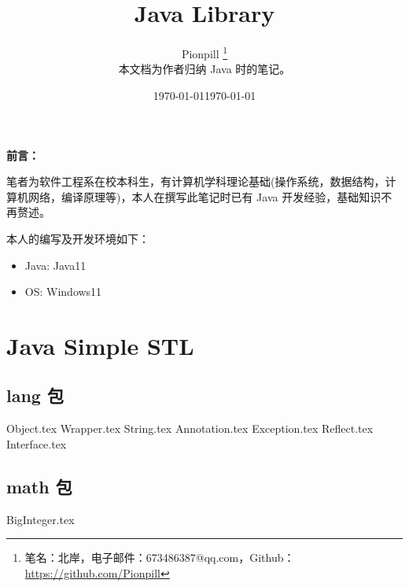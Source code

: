 \documentclass{PionpillNote-book}
\title{Java Library}
\author{
    Pionpill \footnote{笔名：北岸，电子邮件：673486387@qq.com，Github：\url{https://github.com/Pionpill}} \\
    本文档为作者归纳 Java 时的笔记。\\
}
\date{\today}
\begin{document}
\pagestyle{plain}
\maketitle

\noindent\textbf{前言：}

笔者为软件工程系在校本科生，有计算机学科理论基础(操作系统，数据结构，计算机网络，编译原理等)，本人在撰写此笔记时已有 Java 开发经验，基础知识不再赘述。

本人的编写及开发环境如下：
\begin{itemize}
    \item Java: Java11
    \item OS: Windows11
\end{itemize}

\date{\today}
\newpage

\tableofcontents

\newpage

\setcounter{page}{1} 
\pagestyle{fancy}

\part{Java Simple STL}
\chapter{lang 包}
{Object.tex}
{Wrapper.tex}
{String.tex}
{Annotation.tex}
{Exception.tex}
{Reflect.tex}
{Interface.tex}
\chapter{math 包}
{BigInteger.tex}

\end{document}
